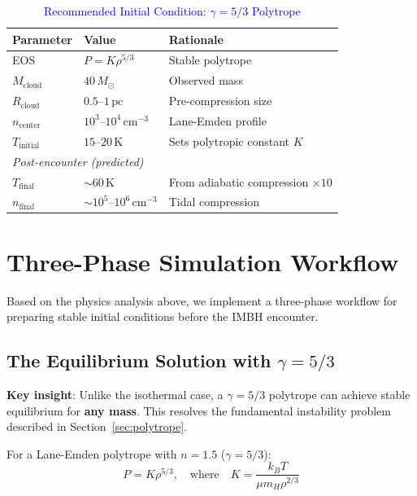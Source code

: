 \documentclass[11pt,a4paper]{article}
\newcommand{\Msun}{M_\odot}
\newcommand{\pc}{\,\mathrm{pc}}
\newcommand{\cmcubed}{\,\mathrm{cm^{-3}}}
\begin{document}
\begin{table}[h]
\centering
\caption{\textcolor{blue}{Recommended Initial Condition: $\gamma = 5/3$ Polytrope}}
\begin{tabular}{lll}
\toprule
\textbf{Parameter} & \textbf{Value} & \textbf{Rationale} \\
\midrule
EOS & $P = K \rho^{5/3}$ & Stable polytrope \\
$M_\mathrm{cloud}$ & $40\,\Msun$ & Observed mass \\
$R_\mathrm{cloud}$ & $0.5$--$1\pc$ & Pre-compression size \\
$n_\mathrm{center}$ & $10^3$--$10^4\cmcubed$ & Lane-Emden profile \\
$T_\mathrm{initial}$ & $15$--$20\,\mathrm{K}$ & Sets polytropic constant $K$ \\
\midrule
\multicolumn{3}{l}{\textit{Post-encounter (predicted)}} \\
$T_\mathrm{final}$ & $\sim 60\,\mathrm{K}$ & From adiabatic compression $\times 10$ \\
$n_\mathrm{final}$ & $\sim 10^5$--$10^6\cmcubed$ & Tidal compression \\
\bottomrule
\end{tabular}
\end{table}

\section{Three-Phase Simulation Workflow}
\label{sec:three_phase}

Based on the physics analysis above, we implement a three-phase workflow for
preparing stable initial conditions before the IMBH encounter.

\subsection{The Equilibrium Solution with $\gamma = 5/3$}

\textbf{Key insight}: Unlike the isothermal case, a $\gamma = 5/3$ polytrope
can achieve stable equilibrium for \textbf{any mass}. This resolves the fundamental
instability problem described in Section~\ref{sec:polytrope}.

For a Lane-Emden polytrope with $n = 1.5$ ($\gamma = 5/3$):
\begin{equation}
    P = K \rho^{5/3}, \quad \text{where} \quad K = \frac{k_B T}{\mu m_H \rho^{2/3}}
\end{equation}
\end{document}
